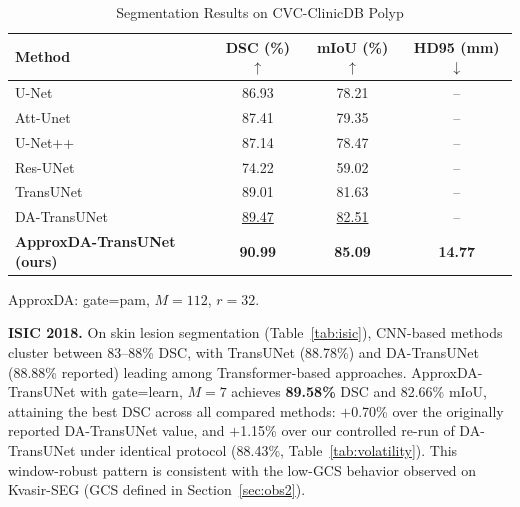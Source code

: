\begin{table}[ht]
  \caption{Segmentation Results on CVC-ClinicDB Polyp}
  \label{tab:cvc}
  \centering
  \setlength{\tabcolsep}{3pt}
  \begin{tabular}{lccc}
    \toprule
    Method & DSC (\%) $\uparrow$ & mIoU (\%) $\uparrow$ & HD95 (mm) $\downarrow$ \\
    \midrule
    U-Net~\cite{ronneberger2015unet}                 & 86.93 & 78.21 & -- \\
    Att-Unet~\cite{oktay2018attention}               & 87.41 & 79.35 & -- \\
    U-Net++~\cite{zhou2018unetpp}                    & 87.14 & 78.47 & -- \\
    Res-UNet~\cite{diakogiannis2020resunet}          & 74.22 & 59.02 & -- \\
    TransUNet~\cite{chen2021transunet}               & 89.01 & 81.63 & -- \\
    DA-TransUNet~\cite{sun2024datransunet}           & \underline{89.47} & \underline{82.51} & -- \\
    \midrule
    \textbf{ApproxDA-TransUNet (ours)}               & \textbf{90.99} & \textbf{85.09} & \textbf{14.77} \\
    \bottomrule
  \end{tabular}
  \par\vspace{5pt}
  \parbox{\columnwidth}{\footnotesize ApproxDA: gate=pam, $M{=}112$, $r{=}32$.}
\end{table}

\textbf{ISIC 2018.} On skin lesion segmentation (Table~\ref{tab:isic}), CNN-based methods cluster between 83--88\% DSC, with TransUNet (88.78\%) and DA-TransUNet (88.88\% reported) leading among Transformer-based approaches. ApproxDA-TransUNet with gate=learn, $M{=}7$ achieves \textbf{89.58\%} DSC and 82.66\% mIoU, attaining the best DSC across all compared methods: $+$0.70\% over the originally reported DA-TransUNet value, and $+$1.15\% over our controlled re-run of DA-TransUNet under identical protocol (88.43\%, Table~\ref{tab:volatility}). This window-robust pattern is consistent with the low-GCS behavior observed on Kvasir-SEG (GCS defined in Section~\ref{sec:obs2}).


